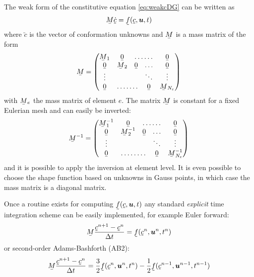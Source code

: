 The weak form of the constitutive equation \eqref{eq:weakcDG}
can be written as
\begin{equation}
   \mat M\utilde{\dot c}=\utilde f(\utilde c,\vek u,t)
\end{equation}
where $\utilde c$ is the vector of conformation unknowns and $\mat M$ is a mass
matrix of the form
\begin{equation}
   \mat M=\begin{pmatrix}
              \mat M_1 & \mat 0 & \hdotsfor{2} & \mat 0 \\
              \mat 0 & \mat M_2 & \mat 0 & \ldots & \mat 0 \\
                              \vdots &  && \ddots  & \vdots \\
              \mat 0 & \hdotsfor{2} & \mat 0 & \mat M_{N_e}
      
          \end{pmatrix}
\end{equation}
with $\mat M_e$ the mass matrix of element $e$. The matrix $\mat M$ is constant
for a fixed Eulerian mesh and can easily be inverted:
\begin{equation}
   \mat M^{-1}=\begin{pmatrix}
              \mat M_1^{-1} & \mat 0 & \hdotsfor{2} & \mat 0 \\
              \mat 0 & \mat M_2^{-1} & \mat 0 & \ldots & \mat 0 \\
                              \vdots &  && \ddots  & \vdots \\
              \mat 0 & \hdotsfor{2} & \mat 0 & \mat M_{N_e}^{-1}
      
          \end{pmatrix}
\end{equation}
and it is possible to apply the inversion at element level. It is even possible
to choose the shape function based on unknowns in Gauss points, 
in which case the mass matrix is a diagonal matrix.	

Once a routine exists for computing $\utilde f(\utilde c,\vek u,t)$ any
standard \emph{explicit} time integration scheme can be easily implemented,
for example Euler forward:
\begin{equation}
   \mat M\dfrac{\utilde c^{n+1}-\utilde c^n}{\Delta t}
                               =\utilde f(\utilde c^n,\vek u^n,t^n)
\end{equation}
or second-order Adams-Bashforth (AB2):
\begin{equation}
   \mat M\dfrac{\utilde c^{n+1}-\utilde c^n}{\Delta t}
                               =\frac32\utilde f(\utilde c^n,\vek u^n,t^n)
                  -\frac12\utilde f(\utilde c^{n-1},\vek u^{n-1},t^{n-1})
\end{equation}

